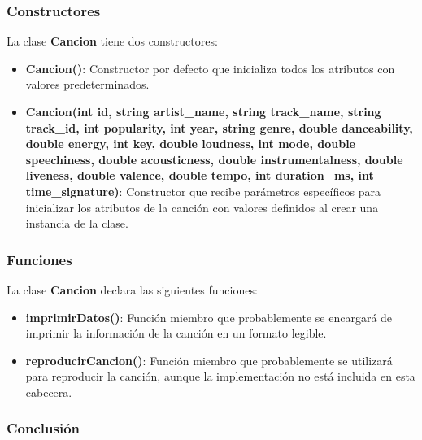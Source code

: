 \documentclass[12pt]{article}
\begin{document}
\begin{flushleft}
            \subsubsection{Constructores}
            
                \noindent\hspace*{4em}La clase \textbf{Cancion} tiene dos constructores:
                
                \begin{itemize}[left=4em]
                    \item \textbf{Cancion()}: Constructor por defecto que inicializa todos los atributos con valores predeterminados. 
                    \item \textbf{Cancion(int id, string artist\_name, string track\_name, string track\_id, int popularity, int year, string genre, double danceability, double energy, int key, double loudness, int mode, double speechiness, double acousticness, double instrumentalness, double liveness, double valence, double tempo, int duration\_ms, int time\_signature)}: Constructor que recibe parámetros específicos para inicializar los atributos de la canción con valores definidos al crear una instancia de la clase.
                \end{itemize}
            
            \subsubsection{Funciones}
            
                \noindent\hspace*{4em}La clase \textbf{Cancion} declara las siguientes funciones:
                
                \begin{itemize}[left=4em]
                    \item \textbf{imprimirDatos()}: Función miembro que probablemente se encargará de imprimir la información de la canción en un formato legible.
                    \item \textbf{reproducirCancion()}: Función miembro que probablemente se utilizará para reproducir la canción, aunque la implementación no está incluida en esta cabecera.
                \end{itemize}
            
            \subsubsection{Conclusión}
            

\end{flushleft}
\end{document}
